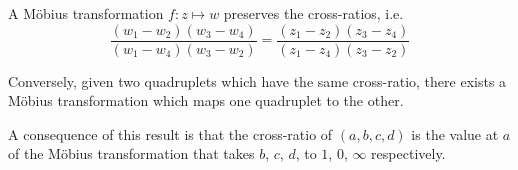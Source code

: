 \documentclass[12pt]{article}
\begin{document}
A M\"obius transformation $f: z \mapsto w$ preserves the cross-ratios, i.e. \\
\begin{displaymath}
\frac{(w_1-w_2)(w_3-w_4)}{(w_1-w_4)(w_3-w_2)} = \frac{(z_1-z_2)(z_3-z_4)}{(z_1-z_4)(z_3-z_2)}
\end{displaymath}

Conversely, given two quadruplets which have the same cross-ratio, there
exists a M\"obius transformation which maps one quadruplet to the other.

A consequence of this result is that the cross-ratio of $(a,b,c,d)$ is the
value at $a$ of the M\"obius transformation that takes $b$, $c$, $d$, to
$1$, $0$, $\infty$ respectively.
\end{document}
